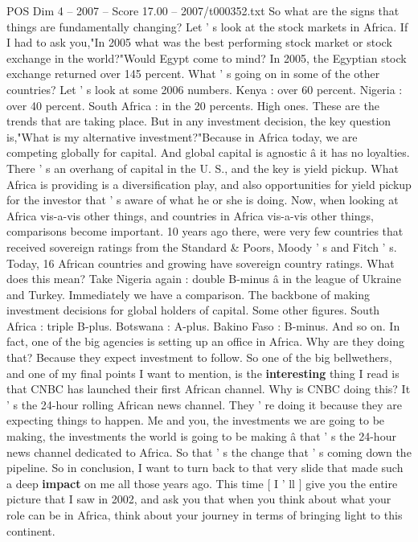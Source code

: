 \begin{textsample}{POS Dim 4 – 2007 – Score 17.00 – 2007/t000352.txt}
So what are the signs that things are fundamentally changing?
Let ' s look at the stock markets in Africa.
If I had to ask you,"In 2005 what was the best performing stock market or stock exchange in the world?"Would Egypt come to mind?
In 2005, the Egyptian stock exchange returned over 145 percent.
What ' s going on in some of the other countries?
Let ' s look at some 2006 numbers.
Kenya : over 60 percent.
Nigeria : over 40 percent.
South Africa : in the 20 percents.
High ones.
These are the trends that are taking place.
But in any investment decision, the key question is,"What is my alternative investment?"Because in Africa today, we are competing globally for capital.
And global capital is agnostic â it has no loyalties.
There ' s an overhang of capital in the U.
S., and the key is yield pickup.
What Africa is providing is a diversification play, and also opportunities for yield pickup for the investor that ' s aware of what he or she is doing.
Now, when looking at Africa vis-a-vis other things, and countries in Africa vis-a-vis other things, comparisons become important. 10 years ago there, were very few countries that received sovereign ratings from the Standard \& Poors, Moody ' s and Fitch ' s.
Today, 16 African countries and growing have sovereign country ratings.
What does this mean?
Take Nigeria again : double B-minus â in the league of Ukraine and Turkey.
Immediately we have a comparison.
The backbone of making investment decisions for global holders of capital.
Some other figures.
South Africa : triple B-plus.
Botswana : A-plus.
Bakino Faso : B-minus.
And so on.
In fact, one of the big agencies is setting up an office in Africa.
Why are they doing that?
Because they expect investment to follow.
So one of the big bellwethers, and one of my final points I want to mention, is the \textbf{interesting} thing I read is that CNBC has launched their first African channel.
Why is CNBC doing this?
It ' s the 24-hour rolling African news channel.
They ' re doing it because they are expecting things to happen.
Me and you, the investments we are going to be making, the investments the world is going to be making â that ' s the 24-hour news channel dedicated to Africa.
So that ' s the change that ' s coming down the pipeline.
So in conclusion, I want to turn back to that very slide that made such a deep \textbf{impact} on me all those years ago.
This time [ I ' ll ] give you the entire picture that I saw in 2002, and ask you that when you think about what your role can be in Africa, think about your journey in terms of bringing light to this continent.

\end{textsample}
